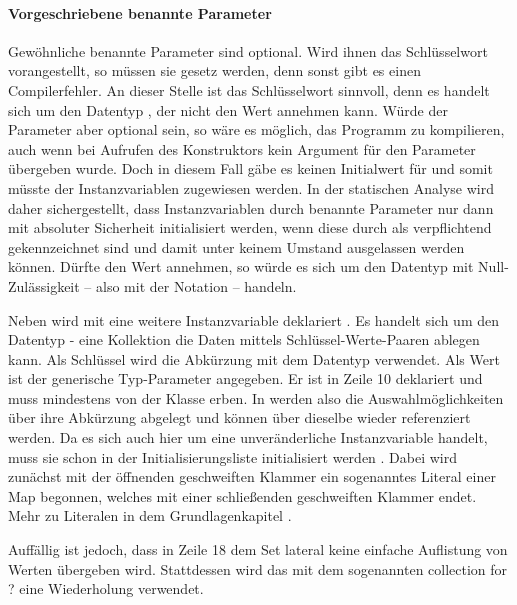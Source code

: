 \paragraph{Vorgeschriebene benannte Parameter}

Gewöhnliche benannte Parameter sind optional.
Wird ihnen das Schlüsselwort  vorangestellt, so müssen sie gesetz werden, denn sonst gibt es einen Compilerfehler.
An dieser Stelle ist das  Schlüsselwort sinnvoll, denn es handelt sich um den Datentyp , der nicht den Wert  annehmen kann.
Würde der Parameter aber optional sein, so wäre es möglich, das Programm zu kompilieren, auch wenn bei Aufrufen des Konstruktors kein Argument für den Parameter übergeben wurde.
Doch in diesem Fall gäbe es keinen Initialwert für  und somit müsste der Instanzvariablen  zugewiesen werden.
In der statischen Analyse wird daher sichergestellt, dass Instanzvariablen durch benannte Parameter nur dann mit absoluter Sicherheit initialisiert werden, wenn diese durch   als verpflichtend gekennzeichnet sind und damit unter keinem Umstand ausgelassen werden können. 
Dürfte  den Wert  annehmen, so würde es sich um den Datentyp  mit Null-Zulässigkeit -- also mit der Notation  -- handeln.

Neben  wird mit  eine weitere Instanzvariable deklariert .
Es handelt sich um den Datentyp  - eine Kollektion die Daten mittels Schlüssel-Werte-Paaren ablegen kann.
Als Schlüssel wird die Abkürzung mit dem Datentyp  verwendet.
Als Wert ist der generische Typ-Parameter  angegeben.
Er ist in Zeile 10 deklariert und muss mindestens von der Klasse  erben.
In  werden also die Auswahlmöglichkeiten über  ihre Abkürzung abgelegt und können über dieselbe wieder referenziert werden.
 Da es sich auch hier um eine unveränderliche Instanzvariable handelt, muss sie schon in der Initialisierungsliste initialisiert werden .
Dabei wird zunächst mit der öffnenden geschweiften Klammer  ein sogenanntes Literal einer Map  begonnen, welches mit einer schließenden geschweiften Klammer  endet.
Mehr zu  Literalen in dem Grundlagenkapitel .



Auffällig ist jedoch, dass in Zeile 18 dem Set lateral keine einfache Auflistung von Werten übergeben wird.
Stattdessen wird das mit dem sogenannten collection for ? eine Wiederholung verwendet.



